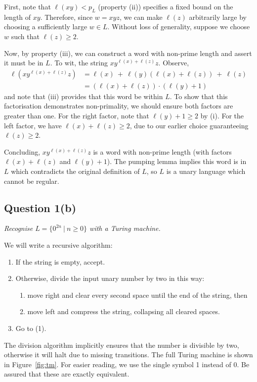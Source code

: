 \documentclass[a4paper]{article}
\begin{document}
First,
note that $\ell(xy) < p_L$ (property (ii)) specifies a fixed bound on the length of $xy$.
Therefore, since $w = xyz$, we can make $\ell(z)$ arbitrarily large by choosing a sufficiently large $w \in L$.
Without loss of generality, suppose we choose $w$ such that $\ell(z) \ge 2$.

Now, by property (iii), we can construct a word with non-prime length and assert it must be in $L$.
To wit, the string
  $xy^{\ell(x)+\ell(z)}z$.
Observe,
\begin{align*}
  \ell(xy^{\ell(x)+\ell(z)}z) &= \ell(x) ~+~ \ell(y) (\ell(x) + \ell(z))~+~ \ell(z) \\
  &= (\ell(x) + \ell(z))\cdot(\ell(y) + 1)
\end{align*}
and note that (iii) provides that this word be within $L$.
%
To show that this factorisation demonstrates non-primality,
we should ensure both factors are greater than one.
For the right factor, note that $\ell(y) + 1 \ge 2$ by (i).
For the left factor, we have $\ell(x) + \ell(z) \ge 2$,
due to our earlier choice guaranteeing $\ell(z) \ge 2$.

Concluding,
$xy^{\ell(x)+\ell(z)}z$
is a word with non-prime length
(with factors $\ell(x) + \ell(z)$ and $\ell(y) + 1$).
The pumping lemma implies this word is in $L$ which contradicts
the original definition of $L$, so $L$ is a unary language which cannot be regular.

%
%


\subsection*{Question 1(b)}
\begin{center}
  \textit{Recognise $L = \{0^{2n}~|~ n \ge 0\}$ with a Turing machine.}
\end{center}
We will write a recursive algorithm:
\begin{enumerate}[(1)]
  \setlength{\itemsep}{0pt}
  \item If the string is empty, accept.
  \item Otherwise, divide the input unary number by two in this way:
    \begin{enumerate}
      \item move right and clear every second space until the end of the string, then
      \item move left and compress the string, collapsing all cleared spaces.
    \end{enumerate}
  \item Go to (1).
\end{enumerate}
The division algorithm implicitly ensures that the number is divisible by two, otherwise it will halt
due to missing transitions.
The full Turing machine is shown in Figure~\ref{fig:tm}.
For easier reading, we use the single symbol 1 instead of 0.
Be assured that these are exactly equivalent.
\end{document}
